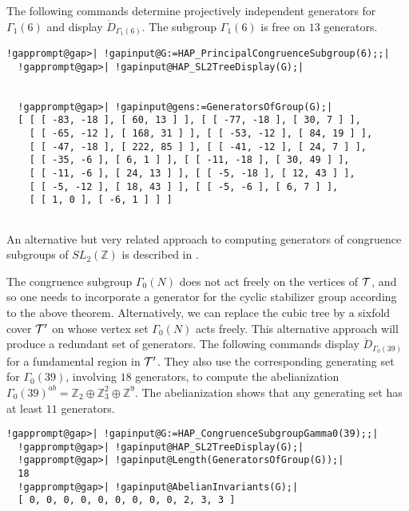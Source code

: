 \documentclass[a4paper,11pt]{report}
\begin{document}
{{ The following commands determine projectively independent generators for $\Gamma_1(6)$ and display $\mathring D_{\Gamma_1(6)}$. The subgroup $\Gamma_1(6)$ is free on $13$ generators. 
\begin{Verbatim}[commandchars=!@|,fontsize=\small,frame=single,label=Example]
  !gapprompt@gap>| !gapinput@G:=HAP_PrincipalCongruenceSubgroup(6);;|
  !gapprompt@gap>| !gapinput@HAP_SL2TreeDisplay(G);|
  
  
  !gapprompt@gap>| !gapinput@gens:=GeneratorsOfGroup(G);|
  [ [ [ -83, -18 ], [ 60, 13 ] ], [ [ -77, -18 ], [ 30, 7 ] ], 
    [ [ -65, -12 ], [ 168, 31 ] ], [ [ -53, -12 ], [ 84, 19 ] ], 
    [ [ -47, -18 ], [ 222, 85 ] ], [ [ -41, -12 ], [ 24, 7 ] ], 
    [ [ -35, -6 ], [ 6, 1 ] ], [ [ -11, -18 ], [ 30, 49 ] ], 
    [ [ -11, -6 ], [ 24, 13 ] ], [ [ -5, -18 ], [ 12, 43 ] ], 
    [ [ -5, -12 ], [ 18, 43 ] ], [ [ -5, -6 ], [ 6, 7 ] ], 
    [ [ 1, 0 ], [ -6, 1 ] ] ]
  
\end{Verbatim}
 

  

An alternative but very related approach to computing generators of congruence
subgroups of $SL_2(\mathbb Z)$ is described in \cite{kulkarni}. 

The congruence subgroup $\Gamma_0(N)$ does not act freely on the vertices of $\cal T$, and so one needs to incorporate a generator for the cyclic stabilizer group
according to the above theorem. Alternatively, we can replace the cubic tree
by a six\texttt{}fold cover ${\cal T}'$ on whose vertex set $\Gamma_0(N)$ acts freely. This alternative approach will produce a redundant set of
generators. The following commands display $\mathring D_{\Gamma_0(39)}$ for a fundamental region in ${\cal T}'$. They also use the corresponding generating set for $\Gamma_0(39)$, involving $18$ generators, to compute the abelianization $\Gamma_0(39)^{ab}= \mathbb Z_2 \oplus \mathbb Z_3^2 \oplus \mathbb Z^9$. The abelianization shows that any generating set has at least $11$ generators. 
\begin{Verbatim}[commandchars=!@|,fontsize=\small,frame=single,label=Example]
  !gapprompt@gap>| !gapinput@G:=HAP_CongruenceSubgroupGamma0(39);;|
  !gapprompt@gap>| !gapinput@HAP_SL2TreeDisplay(G);|
  !gapprompt@gap>| !gapinput@Length(GeneratorsOfGroup(G));|
  18
  !gapprompt@gap>| !gapinput@AbelianInvariants(G);|
  [ 0, 0, 0, 0, 0, 0, 0, 0, 0, 2, 3, 3 ]
  
\end{Verbatim}
 

}}
\end{document}
